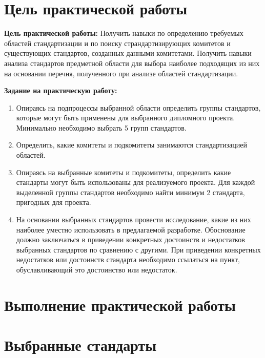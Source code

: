\section*{\LARGE Цель практической работы}

\textbf{Цель практической работы:}
Получить навыки по определению требуемых областей
стандартизации и по поиску страндартизирующих комитетов и
существующих стандартов, созданных данными комитетами. Получить
навыки анализа стандартов предметной области для выбора наиболее
подходящих из них на основании перечня, полученного при анализе
областей стандартизации.

\textbf{Задание на практическую работу:}

\begin{enumerate}
	\item Опираясь на подпроцессы выбранной области определить
		группы стандартов, которые могут быть применены
		для выбранного дипломного проекта.
		Минимально необходимо выбрать 5 групп стандартов.
	\item Определить, какие комитеты и подкомитеты занимаются
		стандартизацией областей.
	\item Опираясь на выбранные комитеты и подкомитеты,
		определить какие стандарты могут быть использованы
		для реализуемого проекта.
		Для каждой выделенной группы стандартов необходимо
		найти минимум 2 стандарта, пригодных для проекта.
	\item На основании выбранных стандартов провести исследование,
		какие из них наиболее уместно использовать в предлагаемой разработке.
		Обоснование должно заключаться в приведении конкретных достоинств
		и недостатков выбранных стандартов по сравнению с другими.
		При приведении конкретных недостатков или достоинств стандарта
		необходимо ссылаться на пункт,
		обуславливающий это достоинство или недостаток.
\end{enumerate}

\clearpage

\section*{\LARGE Выполнение практической работы}

\clearpage



\clearpage

\section{Выбранные стандарты}

